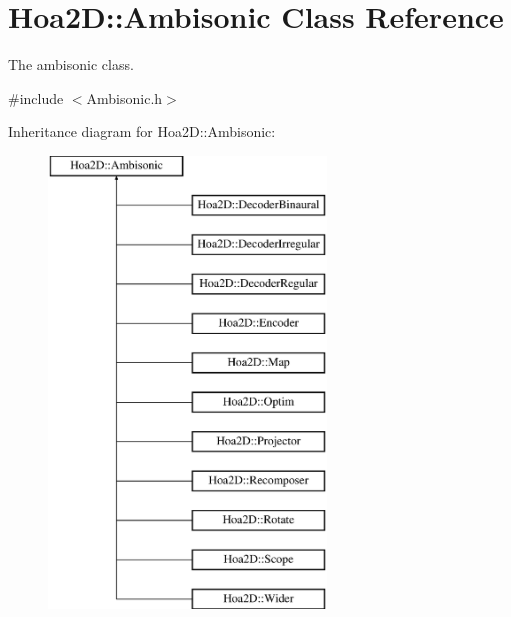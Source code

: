 \hypertarget{class_hoa2_d_1_1_ambisonic}{\section{Hoa2\-D\-:\-:Ambisonic Class Reference}
\label{class_hoa2_d_1_1_ambisonic}
}


The ambisonic class.  




{\ttfamily \#include $<$Ambisonic.\-h$>$}

Inheritance diagram for Hoa2\-D\-:\-:Ambisonic\-:\begin{figure}[H]
\begin{center}
\leavevmode
\includegraphics[height=12.000000cm]{class_hoa2_d_1_1_ambisonic}
\end{center}
\end{figure}
